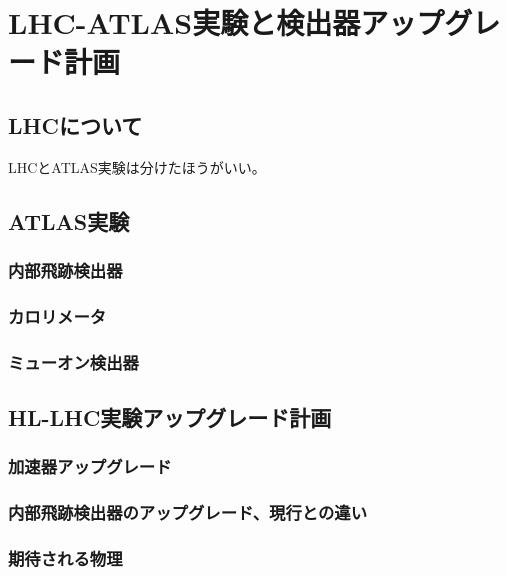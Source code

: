 \chapter{LHC-ATLAS実験と検出器アップグレード計画}

\section{LHCについて}
LHCとATLAS実験は分けたほうがいい。

\section{ATLAS実験}
\subsection{内部飛跡検出器}
\subsection{カロリメータ}
\subsection{ミューオン検出器}

\section{HL-LHC実験アップグレード計画}
\subsection{加速器アップグレード}
\subsection{内部飛跡検出器のアップグレード、現行との違い}
\subsection{期待される物理}
